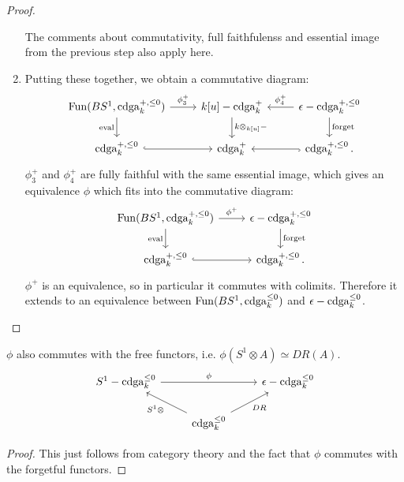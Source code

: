 \begin{proof}
\begin{enumerate}
\[\]
The comments about commutativity, full faithfulenss and essential image from the previous step also apply here.
\item Putting these together, we obtain a commutative diagram:
\[
\begin{tikzcd}
\Fun(BS^1, \cdga_k^{+,\leq 0})\arrow{r}{\phi_3^+}\arrow[swap]{d}{\text{eval}} & k[u]-\cdga^+_k\arrow{d}{k\otimes_{k[u]} -}
& \epsilon-\cdga_k^{+,\leq 0}\arrow[swap]{l}{\phi_4^+}\arrow{d}{\text{forget}} \\
\cdga_k^{+,\leq 0}\arrow[hook]{r} & \cdga_k^+ & \cdga_k^{+,\leq 0}\arrow[hook]{l} .
\end{tikzcd}
\]
$\phi_3^+$ and $\phi_4^+$ are fully faithful with the same essential image, which gives an equivalence $\phi$ which
fits into the commutative diagram:
\[
\begin{tikzcd}
\Fun(BS^1, \cdga_k^{+,\leq 0})\arrow{r}{\phi^+}\arrow[swap]{d}{\text{eval}} & \epsilon-\cdga_k^{+,\leq 0}\arrow{d}{\text{forget}} \\
\cdga_k^{+,\leq 0}\arrow[hook]{r} &  \cdga_k^{+,\leq 0} .
\end{tikzcd}
\]
$\phi^+$ is an equivalence, so in particular it commutes with colimits. Therefore it extends to an equivalence between
$\operatorname{Fun}(BS^1, \operatorname{cdga}_k^{\leq 0})$ and $\epsilon-\operatorname{cdga}_k^{\leq 0}$.
\end{enumerate}
\end{proof}

\begin{thm}
$\phi$ also commutes with the free functors, i.e. $\phi(S^1\otimes A) \simeq DR(A)$.
\[
\begin{tikzcd}
S^1 - \cdga_k^{\leq 0}\arrow{rr}{\phi} & & \epsilon - \cdga_k^{\leq 0} \\
 & \cdga_k^{\leq 0}\arrow[swap]{ur}{DR}\arrow{ul}{S^1 \otimes} & 
\end{tikzcd}
\]
\end{thm}
\begin{proof}
This just follows from category theory and the fact that $\phi$ commutes with the forgetful functors.
\end{proof}


